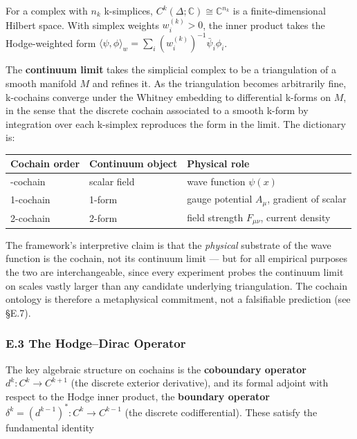 \documentclass[
]{article}
\newcounter{none} %
\begin{document}
For a complex with \(n_k\) k-simplices, \(C^k(\Delta; \mathbb{C}) \cong
\mathbb{C}^{n_k}\) is a finite-dimensional Hilbert space. With simplex
weights \(w^{(k)}_i > 0\), the inner product takes the Hodge-weighted
form
\(\langle \psi, \phi \rangle_{w} = \sum_i (w^{(k)}_i)^{-1} \bar\psi_i \phi_i\).

The \textbf{continuum limit} takes the simplicial complex to be a
triangulation of a smooth manifold \(M\) and refines it. As the
triangulation becomes arbitrarily fine, k-cochains converge under the
Whitney embedding to differential k-forms on \(M\), in the sense that
the discrete cochain associated to a smooth k-form by integration over
each k-simplex reproduces the form in the limit. The dictionary is:

{\def\LTcaptype{none} %
\begin{longtable}[]{@{}lll@{}}
\toprule\noalign{}
Cochain order & Continuum object & Physical role \\
\midrule\noalign{}
\endhead
\bottomrule\noalign{}
\endlastfoot
0-cochain & scalar field & wave function \(\psi(x)\) \\
1-cochain & 1-form & gauge potential \(A_\mu\), gradient of scalar \\
2-cochain & 2-form & field strength \(F_{\mu\nu}\), current density \\
\end{longtable}
}

The framework's interpretive claim is that the \emph{physical} substrate
of the wave function is the cochain, not its continuum limit --- but for
all empirical purposes the two are interchangeable, since every
experiment probes the continuum limit on scales vastly larger than any
candidate underlying triangulation. The cochain ontology is therefore a
metaphysical commitment, not a falsifiable prediction (see §E.7).

\subsubsection{E.3 The Hodge--Dirac
Operator}\label{e.3-the-hodgedirac-operator}

The key algebraic structure on cochains is the \textbf{coboundary
operator} \(d^k : C^k \to C^{k+1}\) (the discrete exterior derivative),
and its formal adjoint with respect to the Hodge inner product, the
\textbf{boundary operator} \(\delta^k = (d^{k-1})^* : C^k \to C^{k-1}\)
(the discrete codifferential). These satisfy the fundamental identity
\end{document}
